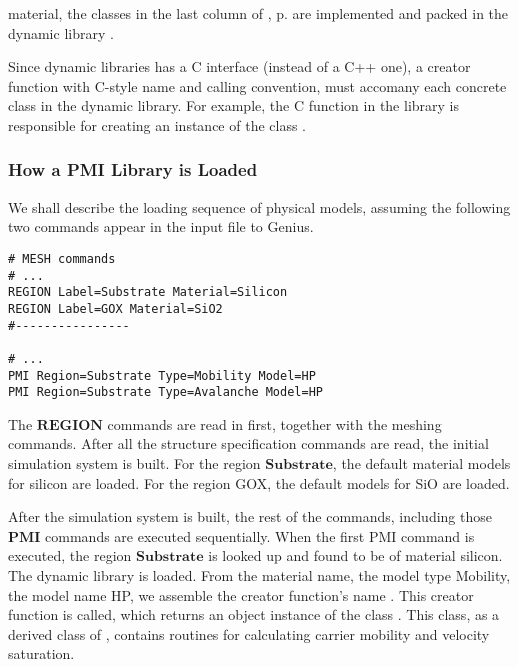 \documentclass[oneside,12pt]{cgd_book}
\begin{document}
          material, the classes in the last column of ,
p. \pageref{fig:Extend:PMI:Classes} are implemented and
          packed in the dynamic library .
\par
Since dynamic libraries has a C interface (instead of a C++ one), a creator function with C-style name
          and calling convention, must accomany each concrete class in the dynamic library. For example, the C function
 in the library
 is
          responsible for creating an instance of the class .
\par
\subsubsection{How a PMI Library is Loaded}
We shall describe the loading sequence of physical models, assuming the following two commands appear in
          the input file to Genius.
\par
\begin{lstlisting}[style=GeniusCode]
# MESH commands
# ...
REGION Label=Substrate Material=Silicon
REGION Label=GOX Material=SiO2
#----------------

# ...
PMI Region=Substrate Type=Mobility Model=HP
PMI Region=Substrate Type=Avalanche Model=HP
\end{lstlisting}
The $\mathbf{REGION}$ commands are read in first, together with the meshing commands. After all
          the structure specification commands are read, the initial simulation system is built. For the region
$\mathbf{Substrate}$, the default material models for silicon are loaded. For the region GOX, the
          default models for SiO are loaded.
\par
After the simulation system is built, the rest of the commands, including those
$\mathbf{PMI}$ commands are executed sequentially. When the first PMI command is executed, the region
$\mathbf{Substrate}$ is looked up and found to be of material silicon. The dynamic library
 is loaded. From the material name, the model type Mobility, the model name HP,
          we assemble the creator function's name . This creator function is called,
          which returns an object instance of the class . This
 class, as a derived class of ,
          contains routines for calculating carrier mobility and velocity saturation.
\par
\end{document}
